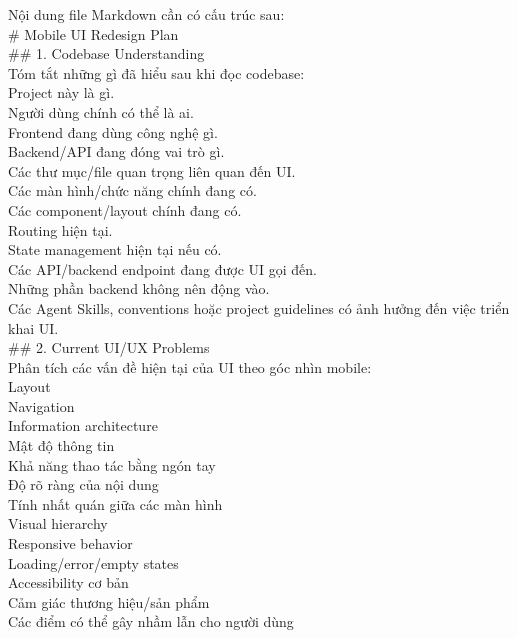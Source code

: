 \begin{enumerate}
Nội dung file Markdown cần có cấu trúc sau: \\

\# Mobile UI Redesign Plan \\

\#\# 1. Codebase Understanding \\

Tóm tắt những gì đã hiểu sau khi đọc codebase: \\
\* Project này là gì. \\
\* Người dùng chính có thể là ai. \\
\* Frontend đang dùng công nghệ gì. \\
\* Backend/API đang đóng vai trò gì. \\
\* Các thư mục/file quan trọng liên quan đến UI. \\
\* Các màn hình/chức năng chính đang có. \\
\* Các component/layout chính đang có. \\
\* Routing hiện tại. \\
\* State management hiện tại nếu có. \\
\* Các API/backend endpoint đang được UI gọi đến. \\
\* Những phần backend không nên động vào. \\
\* Các Agent Skills, conventions hoặc project guidelines có ảnh hưởng đến việc triển khai UI. \\


\#\# 2. Current UI/UX Problems \\

Phân tích các vấn đề hiện tại của UI theo góc nhìn mobile: \\
\* Layout \\
\* Navigation \\
\* Information architecture \\
\* Mật độ thông tin \\
\* Khả năng thao tác bằng ngón tay \\
\* Độ rõ ràng của nội dung \\
\* Tính nhất quán giữa các màn hình \\
\* Visual hierarchy \\
\* Responsive behavior \\
\* Loading/error/empty states \\
\* Accessibility cơ bản \\
\* Cảm giác thương hiệu/sản phẩm \\
\* Các điểm có thể gây nhầm lẫn cho người dùng \\



\end{enumerate}
